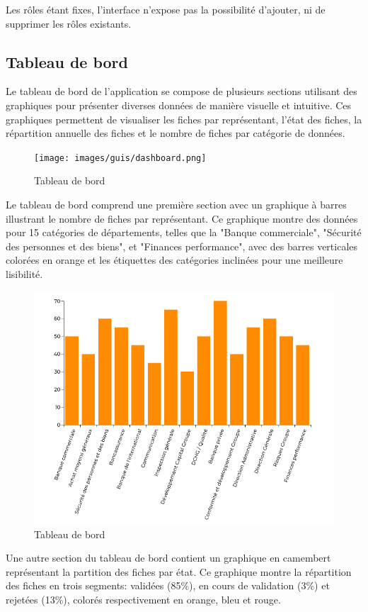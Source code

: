 \noindent Les rôles étant fixes, l'interface n'expose pas la possibilité d'ajouter, ni de supprimer les rôles existants.

\clearpage

\subsection{Tableau de bord}

Le tableau de bord de l'application se compose de plusieurs sections utilisant des graphiques pour présenter diverses données de manière visuelle et intuitive. Ces graphiques permettent de visualiser les fiches par représentant, l'état des fiches, la répartition annuelle des fiches et le nombre de fiches par catégorie de données. \\

\begin{figure}[H]
    \centering
    \texttt{[image: images/guis/dashboard.png]}
    \caption{Tableau de bord}
\end{figure}


\noindent Le tableau de bord comprend une première section avec un graphique à barres illustrant le nombre de fiches par représentant. Ce graphique montre des données pour 15 catégories de départements, telles que la "Banque commerciale", "Sécurité des personnes et des biens", et "Finances performance", avec des barres verticales colorées en orange et les étiquettes des catégories inclinées pour une meilleure lisibilité.

\begin{figure}[H]
    \centering
    \includegraphics[width=.75\textwidth]{images/guis/dashboard1.png}
    \caption{Tableau de bord}
\end{figure}

\noindent Une autre section du tableau de bord contient un graphique en camembert représentant la partition des fiches par état. Ce graphique montre la répartition des fiches en trois segments: validées (85\%), en cours de validation (3\%) et rejetées (13\%), colorés respectivement en orange, bleu et rouge.

